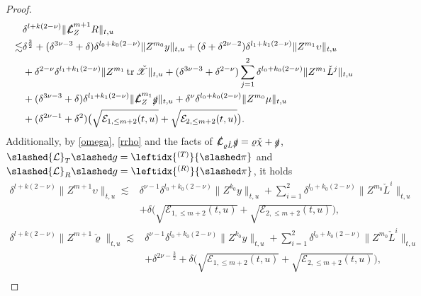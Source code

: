 \documentclass[11pt,twoside]{article}
\def\f{\frac}
\begin{document}
\begin{proof}
\begin{equation}\label{ZR}
\begin{split}
&\delta^{l+k(2-\nu)}\|\slashed{\mathcal L}_Z^{m+1}R\|_{t,u}\\
\lesssim&\delta^{\f32}+(\delta^{3\nu-3}+\delta)\delta^{l_0+k_0(2-\nu)}\|Z^{m_0}y\|_{t,u}+(\delta+\delta^{2\nu-2})\delta^{l_1+k_1(2-\nu)}\|Z^{m_1}\upsilon\|_{t,u}\\
&+\delta^{2-\nu}\delta^{l_1+k_1(2-\nu)}\|Z^{m_1}\operatorname{tr}\check{\mathscr X}\|_{t,u}+(\delta^{3\nu-3}+\delta^{2-\nu})\sum_{j=1}^2\delta^{l_0+k_0(2-\nu)}\|Z^{m_1}\check L^j\|_{t,u}\\
&+(\delta^{3\nu-3}+\delta)\delta^{l_1+k_1(2-\nu)}\|\slashed{\mathcal L}_Z^{m_1}\slashed g\|_{t,u}+\delta^{\nu}\delta^{l_{0}+k_0(2-\nu)}\|Z^{m_{0}}\mu\|_{t,u}\\
&+(\delta^{2\nu-1}+\delta^2) \big( \sqrt{\mathcal{E}_{1,\leq m+2}(t,u)} + \sqrt{\mathcal{E}_{2,\leq m+2}(t,u)}\big).
\end{split}
\end{equation}
Additionally, by \eqref{omega}, \eqref{rrho} and the facts of $\slashed{\mathcal L}_{\varrho\mathring L}\slashed g=\varrho\check\chi+\slashed g$, $\slashed{\mathcal L}_T\slashed g=\leftidx{^{(T)}}{\slashed\pi}$ and $\slashed{\mathcal L}_R\slashed g=\leftidx{^{(R)}}{\slashed\pi}$, it holds
\begin{equation}\label{Zku}
\begin{split}
\delta^{l+k(2-\nu)}\|Z^{m+1}\upsilon\|_{t,u}
\lesssim& \delta^{\nu-1}\delta^{l_0+k_0(2-\nu)}\|Z^{k_0}y\|_{t,u}+\sum_{i=1}^2\delta^{l_0+k_0(2-\nu)}\|Z^{m_0}\check L^i\|_{t,u}\\
&+\delta\bigl( \sqrt{\mathcal{E}_{1,\leq m+2}(t,u)} + \sqrt{\mathcal{E}_{2,\leq m+2}(t,u)} \bigr),
\end{split}
\end{equation}
\begin{equation}\label{Zkr}
\begin{split}
\delta^{l+k(2-\nu)}\|Z^{m+1}\check\varrho\|_{t,u}\lesssim&\delta^{\nu-1}\delta^{l_0+k_0(2-\nu)}\|Z^{k_0}y\|_{t,u}
+\sum_{i=1}^2\delta^{l_0+k_0(2-\nu)}\|Z^{m_0}\check L^i\|_{t,u}\\
&+\delta^{2\nu-\f32}+ \delta \bigl( \sqrt{\mathcal{E}_{1,\leq m+2}(t,u)} + \sqrt{\mathcal{E}_{2,\leq m+2}(t,u)} \bigr),
\end{split}
\end{equation}
\begin{equation}\label{Zkg}
\begin{split}

\end{split}
\end{equation}
\end{proof}
\end{document}
